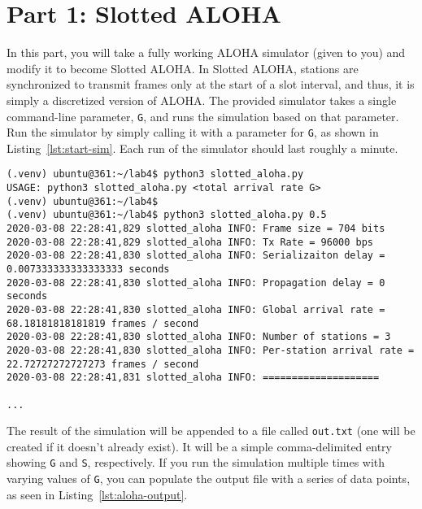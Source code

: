 \documentclass[11pt]{article}
\begin{document}


\section{Part 1: Slotted ALOHA}
\label{sec:sotted-aloha}
In this part, you will take a fully working ALOHA simulator (given to you) and modify it to become Slotted ALOHA.
In Slotted ALOHA, stations are synchronized to transmit frames only at the start of a slot interval, and thus, it is simply a discretized version of ALOHA.
The provided simulator takes a single command-line parameter, \texttt{G}, and runs the simulation based on that parameter.
Run the simulator by simply calling it with a parameter for \texttt{G}, as shown in Listing~\ref{lst:start-sim}.
Each run of the simulator should last roughly a minute.

\begin{lstlisting}[style=ece361shell, caption={Running the Slotted ALOHA simulator (default behaviour is ALOHA)}, label={lst:start-sim}]
(.venv) ubuntu@361:~/lab4$ python3 slotted_aloha.py
USAGE: python3 slotted_aloha.py <total arrival rate G>
(.venv) ubuntu@361:~/lab4$
(.venv) ubuntu@361:~/lab4$ python3 slotted_aloha.py 0.5
2020-03-08 22:28:41,829 slotted_aloha INFO: Frame size = 704 bits
2020-03-08 22:28:41,829 slotted_aloha INFO: Tx Rate = 96000 bps
2020-03-08 22:28:41,830 slotted_aloha INFO: Serializaiton delay = 0.007333333333333333 seconds
2020-03-08 22:28:41,830 slotted_aloha INFO: Propagation delay = 0 seconds
2020-03-08 22:28:41,830 slotted_aloha INFO: Global arrival rate = 68.18181818181819 frames / second
2020-03-08 22:28:41,830 slotted_aloha INFO: Number of stations = 3
2020-03-08 22:28:41,830 slotted_aloha INFO: Per-station arrival rate = 22.72727272727273 frames / second
2020-03-08 22:28:41,831 slotted_aloha INFO: ====================

...

\end{lstlisting}


The result of the simulation will be appended to a file called \texttt{out.txt} (one will be created if it doesn't already exist). It will be a simple comma-delimited entry showing \texttt{G} and \texttt{S}, respectively.
If you run the simulation multiple times with varying values of \texttt{G}, you can populate the output file with a series of data points, as seen in Listing~\ref{lst:aloha-output}.
\end{document}
